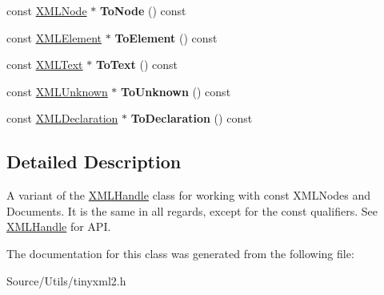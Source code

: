 \begin{DoxyCompactItemize}
const \mbox{\hyperlink{classtinyxml2_1_1_x_m_l_node}{X\+M\+L\+Node}} $\ast$ {\bfseries To\+Node} () const
\item 
\mbox{\label{classtinyxml2_1_1_x_m_l_const_handle_a4dba53c6e201d412e915620feaaa56f3}} 
const \mbox{\hyperlink{classtinyxml2_1_1_x_m_l_element}{X\+M\+L\+Element}} $\ast$ {\bfseries To\+Element} () const
\item 
\mbox{\label{classtinyxml2_1_1_x_m_l_const_handle_a80e24d90d476005aa35602a665358e2d}} 
const \mbox{\hyperlink{classtinyxml2_1_1_x_m_l_text}{X\+M\+L\+Text}} $\ast$ {\bfseries To\+Text} () const
\item 
\mbox{\label{classtinyxml2_1_1_x_m_l_const_handle_a4395e5feaba7b456a81ca274880ea3d3}} 
const \mbox{\hyperlink{classtinyxml2_1_1_x_m_l_unknown}{X\+M\+L\+Unknown}} $\ast$ {\bfseries To\+Unknown} () const
\item 
\mbox{\label{classtinyxml2_1_1_x_m_l_const_handle_a55e306d105fa80d626041e4d3b77b716}} 
const \mbox{\hyperlink{classtinyxml2_1_1_x_m_l_declaration}{X\+M\+L\+Declaration}} $\ast$ {\bfseries To\+Declaration} () const
\end{DoxyCompactItemize}


\subsection{Detailed Description}
A variant of the \mbox{\hyperlink{classtinyxml2_1_1_x_m_l_handle}{X\+M\+L\+Handle}} class for working with const X\+M\+L\+Nodes and Documents. It is the same in all regards, except for the \textquotesingle{}const\textquotesingle{} qualifiers. See \mbox{\hyperlink{classtinyxml2_1_1_x_m_l_handle}{X\+M\+L\+Handle}} for A\+PI. 

The documentation for this class was generated from the following file\+:\begin{DoxyCompactItemize}
\item 
Source/\+Utils/tinyxml2.\+h\end{DoxyCompactItemize}
